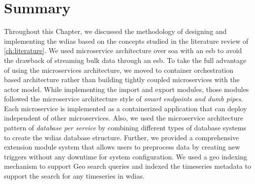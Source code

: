 \section{Summary}
\label{se:method_summary}

Throughout this Chapter, we discussed the methodology of designing and implementing the \acrshort{wdias} based on the concepts studied in the literature review of \cref{ch:literature}. We used microservice architecture over \acrshort{soa} with an \acrshort{esb} to avoid the drawback of streaming bulk data through an \acrshort{esb}. To take the full advantage of using the microservices architecture, we moved to container orchestration based architecture rather than building tightly coupled microservices with the actor model. 
While implementing the import and export modules, those modules followed the microservice architecture style of \emph{smart endpoints and dumb pipes}. Each microservice is implemented as a containerized application that can deploy independent of other microservices. Also, we used the microservice architecture pattern of \emph{database per service} by combining different types of database systems to create the \acrshort{wdias} database structure. Further, we provided a comprehensive extension module system that allows users to preprocess data by creating new triggers without any downtime for system configuration. We used a geo indexing mechanism to support Geo search queries and indexed the timeseries metadata to support the search for any timeseries in \acrshort{wdias}.
